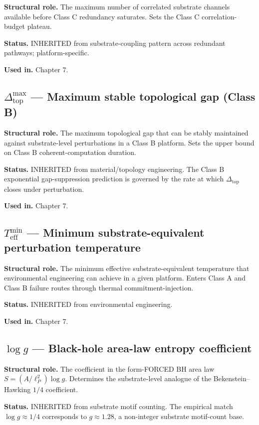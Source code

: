 \documentclass[11pt]{book}
\begin{document}
\textbf{Structural role.} The maximum number of correlated substrate channels available before Class C redundancy saturates. Sets the Class C correlation-budget plateau.

\textbf{Status.} INHERITED from substrate-coupling pattern across redundant pathways; platform-specific.

\textbf{Used in.} Chapter 7.

\subsection{$\Delta_\mathrm{top}^{\max}$ — Maximum stable topological gap (Class B)}

\textbf{Structural role.} The maximum topological gap that can be stably maintained against substrate-level perturbations in a Class B platform. Sets the upper bound on Class B coherent-computation duration.

\textbf{Status.} INHERITED from material/topology engineering. The Class B exponential gap-suppression prediction is governed by the rate at which $\Delta_\mathrm{top}$ closes under perturbation.

\textbf{Used in.} Chapter 7.

\subsection{$T_\mathrm{eff}^{\min}$ — Minimum substrate-equivalent perturbation temperature}

\textbf{Structural role.} The minimum effective substrate-equivalent temperature that environmental engineering can achieve in a given platform. Enters Class A and Class B failure routes through thermal commitment-injection.

\textbf{Status.} INHERITED from environmental engineering.

\textbf{Used in.} Chapter 7.

\subsection{$\log g$ — Black-hole area-law entropy coefficient}

\textbf{Structural role.} The coefficient in the form-FORCED BH area law $S = (A/\ell_P^2)\log g$. Determines the substrate-level analogue of the Bekenstein–Hawking $1/4$ coefficient.

\textbf{Status.} INHERITED from substrate motif counting. The empirical match $\log g \approx 1/4$ corresponds to $g \approx 1.28$, a non-integer substrate motif-count base.
\end{document}
